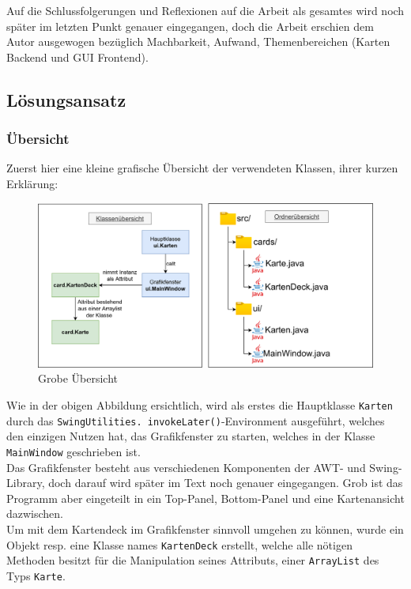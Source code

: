 \documentclass[a4paper,11pt]{article}
\begin{document}
Auf die Schlussfolgerungen und Reflexionen auf die Arbeit als gesamtes wird noch später im letzten Punkt genauer eingegangen, doch die Arbeit erschien dem Autor ausgewogen bezüglich Machbarkeit, Aufwand, Themenbereichen (Karten Backend und GUI Frontend).

\subsection{Lösungsansatz}

\subsubsection{Übersicht}

Zuerst hier eine kleine grafische Übersicht der verwendeten Klassen, ihrer kurzen Erklärung:

\begin{figure}[H]
    \centering
    \includegraphics[width=\textwidth]{media/class-overview.png}
    \caption{Grobe Übersicht}
\end{figure}

Wie in der obigen Abbildung ersichtlich, wird als erstes die Hauptklasse \texttt{Karten} durch das \texttt{SwingUtilities.
invokeLater()}-Environment ausgeführt, welches den einzigen Nutzen hat, das Grafikfenster zu starten, welches in der Klasse \texttt{MainWindow} geschrieben ist.\\

Das Grafikfenster besteht aus verschiedenen Komponenten der AWT- und Swing-Library, doch darauf wird später im Text noch genauer eingegangen. Grob ist das Programm aber eingeteilt in ein Top-Panel, Bottom-Panel und eine Kartenansicht dazwischen.\\

Um mit dem Kartendeck im Grafikfenster sinnvoll umgehen zu können, wurde ein Objekt resp. eine Klasse names \texttt{KartenDeck} erstellt, welche alle nötigen Methoden besitzt für die Manipulation seines Attributs, einer \texttt{ArrayList} des Typs \texttt{Karte}.
\end{document}
